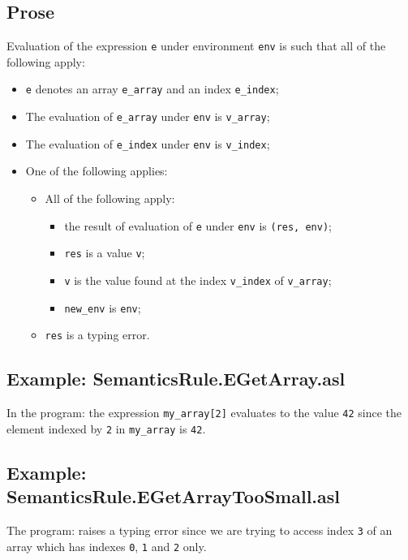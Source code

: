 \documentclass{book}
\begin{document}
  \subsection{Prose}
  Evaluation of the expression \texttt{e} under environment \texttt{env} is
  such that all of the following apply:
  \begin{itemize}
  \item \texttt{e} denotes an array \texttt{e\_array} and an index \texttt{e\_index};
  \item The evaluation of \texttt{e\_array} under \texttt{env} is \texttt{v\_array};
  \item The evaluation of \texttt{e\_index} under \texttt{env} is \texttt{v\_index};
  \item One of the following applies:
        \begin{itemize}
        \item All of the following apply:
          \begin{itemize}
          \item the result of evaluation of \texttt{e} under \texttt{env} is \texttt{(res, env)};
          \item \texttt{res} is a value \texttt{v};
          \item \texttt{v} is the value found at the index \texttt{v\_index} of \texttt{v\_array};
          \item \texttt{new\_env} is \texttt{env};
          \end{itemize}

        \item \texttt{res} is a typing error.
        \end{itemize}
  \end{itemize}

  \subsection{Example: SemanticsRule.EGetArray.asl}
    In the program:
    the expression \texttt{my\_array[2]} evaluates to the value \texttt{42} since the element
    indexed by \texttt{2} in \texttt{my\_array} is \texttt{42}.

  \subsection{Example: SemanticsRule.EGetArrayTooSmall.asl}
    The program:
    raises a typing error since we are trying to access index \texttt{3} of an array
    which has indexes \texttt{0}, \texttt{1} and \texttt{2} only.
\end{document}
